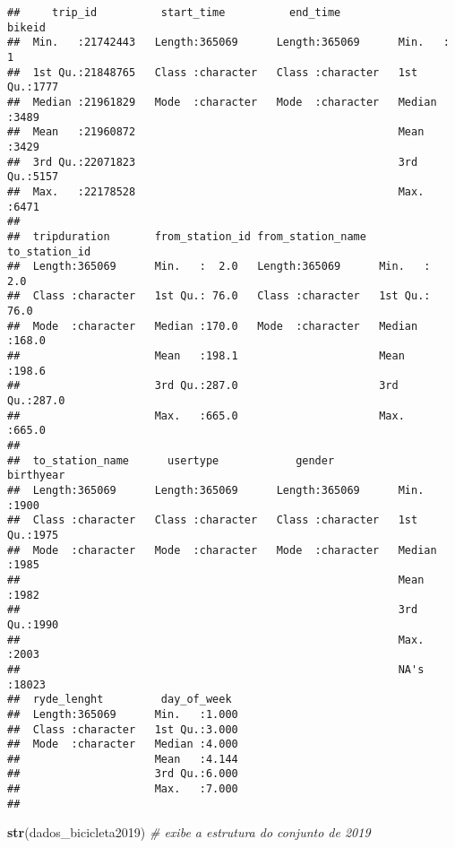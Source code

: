 \documentclass[
]{article}
\newenvironment{Shaded}{\begin{snugshade}}{\end{snugshade}}
\newcommand{\CommentTok}[1]{\textcolor[rgb]{0.56,0.35,0.01}{\textit{#1}}}
\newcommand{\FunctionTok}[1]{\textcolor[rgb]{0.13,0.29,0.53}{\textbf{#1}}}
\newcommand{\NormalTok}[1]{#1}
\begin{document}
\begin{verbatim}
##     trip_id          start_time          end_time             bikeid    
##  Min.   :21742443   Length:365069      Length:365069      Min.   :   1  
##  1st Qu.:21848765   Class :character   Class :character   1st Qu.:1777  
##  Median :21961829   Mode  :character   Mode  :character   Median :3489  
##  Mean   :21960872                                         Mean   :3429  
##  3rd Qu.:22071823                                         3rd Qu.:5157  
##  Max.   :22178528                                         Max.   :6471  
##                                                                         
##  tripduration       from_station_id from_station_name  to_station_id  
##  Length:365069      Min.   :  2.0   Length:365069      Min.   :  2.0  
##  Class :character   1st Qu.: 76.0   Class :character   1st Qu.: 76.0  
##  Mode  :character   Median :170.0   Mode  :character   Median :168.0  
##                     Mean   :198.1                      Mean   :198.6  
##                     3rd Qu.:287.0                      3rd Qu.:287.0  
##                     Max.   :665.0                      Max.   :665.0  
##                                                                       
##  to_station_name      usertype            gender            birthyear    
##  Length:365069      Length:365069      Length:365069      Min.   :1900   
##  Class :character   Class :character   Class :character   1st Qu.:1975   
##  Mode  :character   Mode  :character   Mode  :character   Median :1985   
##                                                           Mean   :1982   
##                                                           3rd Qu.:1990   
##                                                           Max.   :2003   
##                                                           NA's   :18023  
##  ryde_lenght         day_of_week   
##  Length:365069      Min.   :1.000  
##  Class :character   1st Qu.:3.000  
##  Mode  :character   Median :4.000  
##                     Mean   :4.144  
##                     3rd Qu.:6.000  
##                     Max.   :7.000  
## 
\end{verbatim}

\begin{Shaded}
\begin{Highlighting}[]
\FunctionTok{str}\NormalTok{(dados\_bicicleta2019) }\CommentTok{\# exibe a estrutura do conjunto de 2019}
\end{Highlighting}
\end{Shaded}
\end{document}
